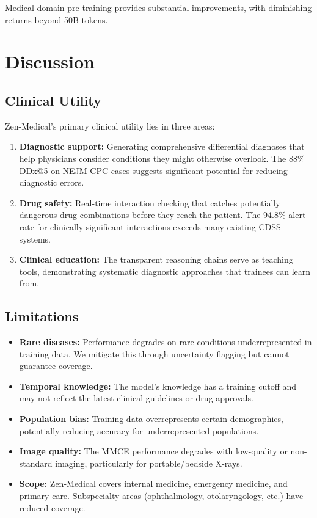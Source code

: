 \documentclass[11pt,a4paper]{article}
\begin{document}
Medical domain pre-training provides substantial improvements, with diminishing returns beyond 50B tokens.

\section{Discussion}
\label{sec:discussion}

\subsection{Clinical Utility}

Zen-Medical's primary clinical utility lies in three areas:
\begin{enumerate}
    \item \textbf{Diagnostic support:} Generating comprehensive differential diagnoses that help physicians consider conditions they might otherwise overlook. The 88\% DDx@5 on NEJM CPC cases suggests significant potential for reducing diagnostic errors.
    \item \textbf{Drug safety:} Real-time interaction checking that catches potentially dangerous drug combinations before they reach the patient. The 94.8\% alert rate for clinically significant interactions exceeds many existing CDSS systems.
    \item \textbf{Clinical education:} The transparent reasoning chains serve as teaching tools, demonstrating systematic diagnostic approaches that trainees can learn from.
\end{enumerate}

\subsection{Limitations}

\begin{itemize}
    \item \textbf{Rare diseases:} Performance degrades on rare conditions underrepresented in training data. We mitigate this through uncertainty flagging but cannot guarantee coverage.
    \item \textbf{Temporal knowledge:} The model's knowledge has a training cutoff and may not reflect the latest clinical guidelines or drug approvals.
    \item \textbf{Population bias:} Training data overrepresents certain demographics, potentially reducing accuracy for underrepresented populations.
    \item \textbf{Image quality:} The MMCE performance degrades with low-quality or non-standard imaging, particularly for portable/bedside X-rays.
    \item \textbf{Scope:} Zen-Medical covers internal medicine, emergency medicine, and primary care. Subspecialty areas (ophthalmology, otolaryngology, etc.) have reduced coverage.
\end{itemize}
\end{document}
